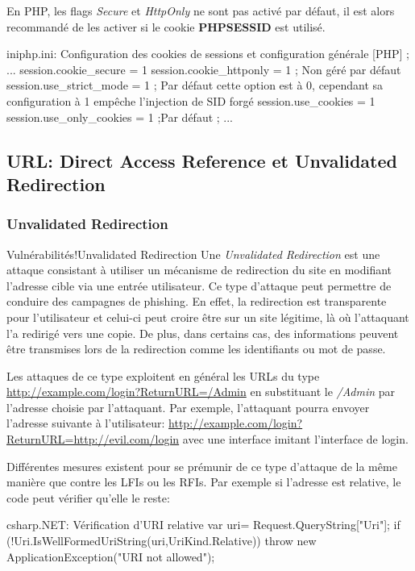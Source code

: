 En PHP, les flags \textit{Secure} et \textit{HttpOnly} ne sont pas activé par défaut, il est alors recommandé de les activer si le cookie \textbf{PHPSESSID} est utilisé.
\begin{Config}{ini}{php.ini: Configuration des cookies de sessions et configuration générale}
[PHP]
; ...
session.cookie_secure = 1 
session.cookie_httponly = 1 
; Non géré par défaut 
session.use_strict_mode = 1
; Par défaut cette option est à 0, cependant sa configuration à 1 empêche l'injection de SID forgé
session.use_cookies = 1
session.use_only_cookies = 1
;Par défaut
; ...
\end{Config}


\subsection{URL: Direct Access Reference et Unvalidated Redirection}
\subsubsection{Unvalidated Redirection}
\begin{Define}{Vulnérabilités!Unvalidated Redirection}
Une \textit{Unvalidated Redirection} est une attaque consistant à utiliser un mécanisme de redirection du site en modifiant l'adresse cible via une entrée utilisateur. Ce type d'attaque peut permettre de conduire des campagnes de phishing. En effet, la redirection est transparente pour l'utilisateur et celui-ci peut croire être sur un site légitime, là où l'attaquant l'a redirigé vers une copie. De plus, dans certains cas, des informations peuvent être transmises lors de la redirection comme les identifiants ou mot de passe.
\end{Define}

Les attaques de ce type exploitent en général les URLs du type \url{http://example.com/login?ReturnURL=/Admin} en substituant le \textit{/Admin} par l'adresse choisie par l'attaquant. Par exemple, l'attaquant pourra envoyer l'adresse suivante à l'utilisateur: \url{http://example.com/login?ReturnURL=http://evil.com/login} avec une interface imitant l'interface de login.

Différentes mesures existent pour se prémunir de ce type d'attaque de la même manière que contre les \gls{LFI}s ou les \gls{RFI}s. Par exemple si l'adresse est relative, le code peut vérifier qu'elle le reste:
\begin{Config}{csharp}{.NET: Vérification d'URI relative}
var uri= Request.QueryString["Uri"];
if (!Uri.IsWellFormedUriString(uri,UriKind.Relative)){
	throw new ApplicationException("URI not allowed");
}
\end{Config}


